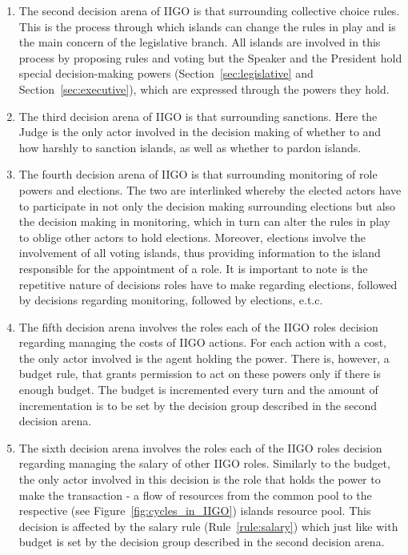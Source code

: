 \begin{itemize}
\begin{enumerate}
        \item The second decision arena of IIGO is that surrounding collective choice rules. This is the process through which islands can change the rules in play and is the main concern of the legislative branch. All islands are involved in this process by proposing rules and voting but the Speaker and the President hold special decision-making powers (Section~\ref*{sec:legislative} and Section~\ref*{sec:executive}), which are expressed through the powers they hold.
        
        \item The third decision arena of IIGO is that surrounding sanctions. Here the Judge is the only actor involved in the decision making of whether to and how harshly to sanction islands, as well as whether to pardon islands.
        
        \item The fourth decision arena of IIGO is that surrounding monitoring of role powers and elections. The two are interlinked whereby the elected actors have to participate in not only the decision making surrounding elections but also the decision making in monitoring, which in turn can alter the rules in play to oblige other actors to hold elections. Moreover, elections involve the involvement of all voting islands, thus providing information to the island responsible for the appointment of a role. It is important to note is the repetitive nature of decisions roles have to make regarding elections, followed by decisions regarding monitoring, followed by elections, e.t.c. 
        
        \item The fifth decision arena involves the roles each of the IIGO roles decision regarding managing the costs of IIGO actions. For each action with a cost, the only actor involved is the agent holding the power. There is, however, a budget rule, that grants permission to act on these powers only if there is enough budget. The budget is incremented every turn and the amount of incrementation is to be set by the decision group described in the second decision arena.
        
        \item The sixth decision arena involves the roles each of the IIGO roles decision regarding managing the salary of other IIGO roles. Similarly to the budget, the only actor involved in this decision is the role that holds the power to make the transaction - a flow of resources from the common pool to the respective (see Figure~\ref{fig:cycles_in_IIGO}) islands resource pool. This decision is affected by the salary rule (Rule~\ref{rule:salary}) which just like with budget is set by the decision group described in the second decision arena.
        

\end{enumerate}
\end{itemize}
